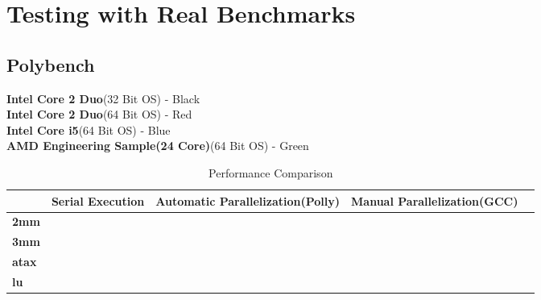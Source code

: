 \documentclass[a4paper,12pt]{book}
\begin{document}
\chapter{Testing with Real Benchmarks}
\section{Polybench}
\textbf{Intel Core 2 Duo}(32 Bit OS) - Black \\
\textbf{Intel Core 2 Duo}(64 Bit OS) - Red   \\
\textbf{Intel Core i5}(64 Bit OS)    - Blue  \\
\textbf{AMD Engineering Sample(24 Core)}(64 Bit OS) - Green \\

\begin{table}[h]
\begin{center}
{\footnotesize
\begin{tabular}{| l | p{2cm} | p{2cm} | p{2cm} | p{2cm} |}
\hline
                  &\textbf{Serial Execution} & \textbf{Automatic Parallelization(Polly)} & \textbf{Manual Parallelization(GCC)} \\ \hline
\textbf{2mm}      &                          &                                           &                                      \\ \hline
\textbf{3mm}      &                          &                                           &                                      \\ \hline
\textbf{atax}     &                          &                                           &                                      \\ \hline
\textbf{lu}       &                          &                                           &                                      \\
\hline

\end{tabular}
}
\end{center}
\caption{Performance Comparison}
\end{table}
\end{document}
